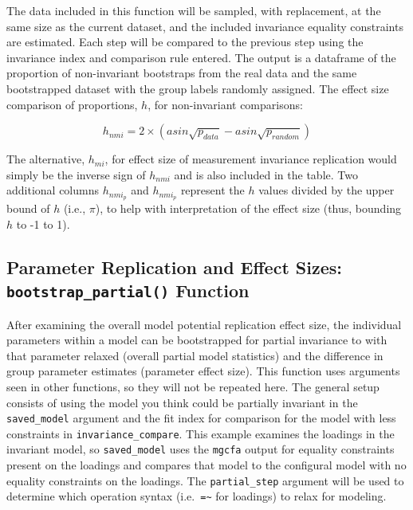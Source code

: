 \documentclass[
  man]{apa7}
\begin{document}
\normalsize

The data included in this function will be sampled, with replacement, at the same size as the current dataset, and the included invariance equality constraints are estimated. Each step will be compared to the previous step using the invariance index and comparison rule entered. The output is a dataframe of the proportion of non-invariant bootstraps from the real data and the same bootstrapped dataset with the group labels randomly assigned. The effect size comparison of proportions, \(h\), for non-invariant comparisons:

\[h_{nmi} = 2 \times (asin\sqrt{p_{data}} - asin\sqrt{p_{random}})\]

The alternative, \(h_{mi}\), for effect size of measurement invariance replication would simply be the inverse sign of \(h_{nmi}\) and is also included in the table. Two additional columns \(h_{nmi_p}\) and \(h_{nmi_p}\) represent the \(h\) values divided by the upper bound of \(h\) (i.e., \(\pi\)), to help with interpretation of the effect size (thus, bounding \(h\) to -1 to 1).

\newpage

\subsection{\texorpdfstring{Parameter Replication and Effect Sizes: \texttt{bootstrap\_partial()} Function}{Parameter Replication and Effect Sizes: bootstrap\_partial() Function}}\label{parameter-replication-and-effect-sizes-bootstrap_partial-function-1}

After examining the overall model potential replication effect size, the individual parameters within a model can be bootstrapped for partial invariance to with that parameter relaxed (overall partial model statistics) and the difference in group parameter estimates (parameter effect size). This function uses arguments seen in other functions, so they will not be repeated here. The general setup consists of using the model you think could be partially invariant in the \texttt{saved\_model} argument and the fit index for comparison for the model with less constraints in \texttt{invariance\_compare}. This example examines the loadings in the invariant model, so \texttt{saved\_model} uses the \texttt{mgcfa} output for equality constraints present on the loadings and compares that model to the configural model with no equality constraints on the loadings. The \texttt{partial\_step} argument will be used to determine which operation syntax (i.e.~\texttt{=\textasciitilde{}} for loadings) to relax for modeling.
\end{document}
